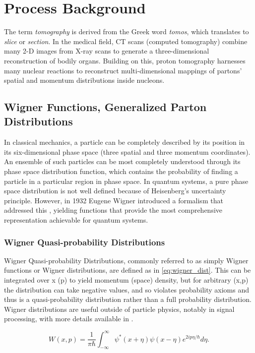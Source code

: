 \section{Process Background}
  The term \textit{tomography} is derived from the Greek word \textit{tomos}, which translates to \textit{slice} or \textit{section}. In the medical field, CT scans (computed tomography) combine many 2-D images from X-ray scans to generate a three-dimensional reconstruction of bodily organs. Building on this, proton tomography harnesses many nuclear reactions to reconstruct multi-dimensional mappings of partons' spatial and momentum distributions inside nucleons. 


    \subsection{Wigner Functions, Generalized Parton Distributions}

        In classical mechanics, a particle can be completely described by its position in its six-dimensional phase space (three spatial and three momentum coordinates). An ensemble of such particles can be most completely understood through its phase space distribution function, which contains the probability of finding a particle in a particular region in phase space. In quantum systems, a pure phase space distribution is not well defined because of Heisenberg's uncertainty principle. However, in 1932 Eugene Wigner introduced a formalism that addressed this \parencite{Wigner1932OnEquilibrium}, yielding functions that provide the most comprehensive representation achievable for quantum systems.
        
        
        \subsubsection*{Wigner Quasi-probability Distributions}
             Wigner Quasi-probability Distributions, commonly referred to as simply Wigner functions or Wigner distributions, are defined as in \eqref{eq:wigner_dist}. This can be integrated over x (p) to yield momentum (space) density, but for arbitrary (x,p) the distribution can take negative values, and so violates probability axioms and thus is a quasi-probability distribution rather than a full probability distribution. Wigner distributions are useful outside of particle physics, notably in signal processing, with more details available in \parencite{Hillery1984DistributionFundamentals}.

             \begin{equation}\label{eq:wigner_dist}
                W(x,p) = \frac{1}{\pi\hbar} \int_{-\infty}^{\infty} \psi^*(x+\eta) \psi(x-\eta) e^{2ip \eta/\hbar} d\eta.
            \end{equation}


